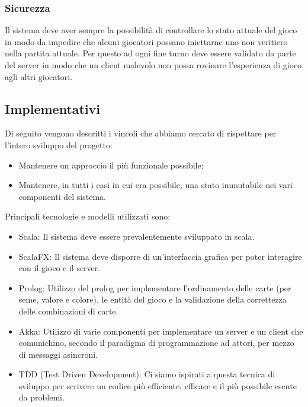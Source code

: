 \subsubsection{Sicurezza}
Il sistema deve aver sempre la possibilità di controllare lo stato attuale del gioco in modo da impedire che alcuni giocatori possano iniettarne uno non veritiero nella partita attuale.
Per questo ad ogni fine turno deve essere validato da parte del server in modo che un client malevolo non possa rovinare l’esperienza di gioco agli altri giocatori.

\subsection{Implementativi}
Di seguito vengono descritti i vincoli che abbiamo cercato di rispettare per l’intero sviluppo del progetto:
\begin{itemize}
    \item Mantenere un approccio il più funzionale possibile;
    \item Mantenere, in tutti i casi in cui era possibile, una stato immutabile nei vari componenti del sistema.
\end{itemize}
Principali tecnologie e modelli utilizzati sono:
\begin{itemize}
    \item Scala: Il sistema deve essere prevalentemente sviluppato in scala.
    \item ScalaFX: Il sistema deve disporre di un’interfaccia grafica per poter interagire con il gioco e il server.
    \item Prolog: Utilizzo del prolog per implementare l’ordinamento delle carte (per seme, valore e colore), le entità del gioco e la validazione della correttezza delle combinazioni di carte.
    \item Akka: Utilizzo di varie componenti per implementare un server e un client che comunichino, secondo il paradigma di programmazione ad attori, per mezzo di messaggi asincroni.
    \item TDD (Test Driven Development): Ci siamo ispirati a questa tecnica di sviluppo per scrivere un codice più efficiente, efficace e il più possibile esente da problemi.
\end{itemize}
\newpage